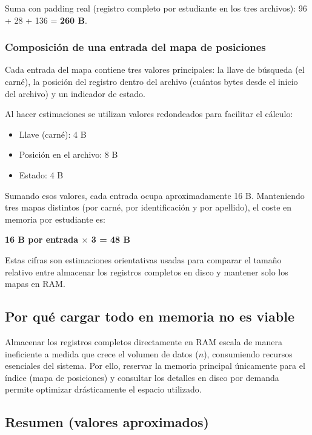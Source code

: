 Suma con padding real (registro completo por estudiante en los tres archivos): 96 + 28 + 136 = \textbf{260 B}.

\subsubsection{Composición de una entrada del mapa de posiciones}
\label{sec:composicion-entrada}

Cada entrada del mapa contiene tres valores principales: 
la llave de búsqueda (el carné), 
la posición del registro dentro del archivo (cuántos bytes desde el inicio del archivo) 
y un indicador de estado.

Al hacer estimaciones se utilizan valores redondeados para facilitar el cálculo:

\begin{itemize}
    \item Llave (carné): 4 B
    \item Posición en el archivo: 8 B
    \item Estado: 4 B
\end{itemize}

Sumando esos valores, cada entrada ocupa aproximadamente 16 B. 
Manteniendo tres mapas distintos (por carné, por identificación y por apellido), el coste en memoria por estudiante es:

\textbf{16 B por entrada $\times$ 3 = 48 B}

Estas cifras son estimaciones orientativas usadas para comparar el tamaño relativo entre almacenar los registros completos en disco y mantener solo los mapas en RAM.

\subsection{Por qué cargar todo en memoria no es viable}

Almacenar los registros completos directamente en RAM escala de manera ineficiente a medida que crece el volumen de datos ($n$), consumiendo recursos esenciales del sistema. Por ello, reservar la memoria principal únicamente para el índice (mapa de posiciones) y consultar los detalles en disco por demanda permite optimizar drásticamente el espacio utilizado.

\subsection{Resumen (valores aproximados)}

